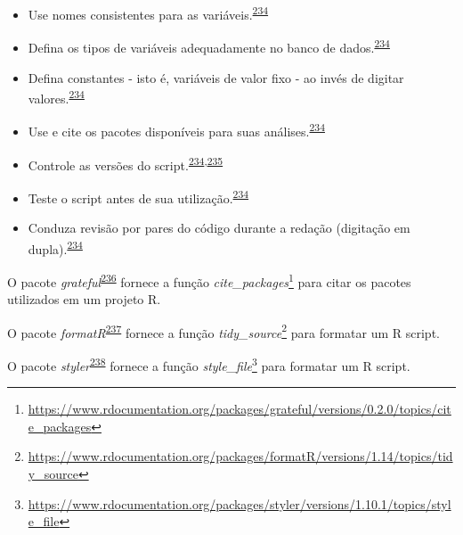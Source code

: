 \documentclass[
  a4paper,
]{book}
\renewcommand{\href}[2]{#2\footnote{\url{#1}}}
\newenvironment{infobox}[1]
  {
  \begin{itemize}
  \renewcommand{\labelitemi}{
    \raisebox{-.7\height}[0pt][0pt]{
      {\setkeys{Gin}{width=3em,keepaspectratio}
        \texttt{[image: \#1]}}
    }
  }
  \setlength{\fboxsep}{1em}
  \begin{blackbox}
  \item
  }
  {
  \end{blackbox}
  \end{itemize}
  }
\begin{document}
\begin{itemize}
\item
  Use nomes consistentes para as variáveis.\textsuperscript{\protect\hyperlink{ref-SchwabSimon2021}{234}}
\item
  Defina os tipos de variáveis adequadamente no banco de dados.\textsuperscript{\protect\hyperlink{ref-SchwabSimon2021}{234}}
\item
  Defina constantes - isto é, variáveis de valor fixo - ao invés de digitar valores.\textsuperscript{\protect\hyperlink{ref-SchwabSimon2021}{234}}
\item
  Use e cite os pacotes disponíveis para suas análises.\textsuperscript{\protect\hyperlink{ref-SchwabSimon2021}{234}}
\item
  Controle as versões do script.\textsuperscript{\protect\hyperlink{ref-SchwabSimon2021}{234},\protect\hyperlink{ref-Eglen2017}{235}}
\item
  Teste o script antes de sua utilização.\textsuperscript{\protect\hyperlink{ref-SchwabSimon2021}{234}}
\item
  Conduza revisão por pares do código durante a redação (digitação em dupla).\textsuperscript{\protect\hyperlink{ref-SchwabSimon2021}{234}}
\end{itemize}

\begin{infobox}{images/Rlogo}
O pacote \emph{grateful}\textsuperscript{\protect\hyperlink{ref-grateful}{236}} fornece a função \href{https://www.rdocumentation.org/packages/grateful/versions/0.2.0/topics/cite_packages}{\emph{cite\_packages}} para citar os pacotes utilizados em um projeto R.

\end{infobox}

\begin{infobox}{images/Rlogo}
O pacote \emph{formatR}\textsuperscript{\protect\hyperlink{ref-formatR}{237}} fornece a função \href{https://www.rdocumentation.org/packages/formatR/versions/1.14/topics/tidy_source}{\emph{tidy\_source}} para formatar um R script.

\end{infobox}

\begin{infobox}{images/Rlogo}
O pacote \emph{styler}\textsuperscript{\protect\hyperlink{ref-styler}{238}} fornece a função \href{https://www.rdocumentation.org/packages/styler/versions/1.10.1/topics/style_file}{\emph{style\_file}} para formatar um R script.

\end{infobox}
\end{document}
